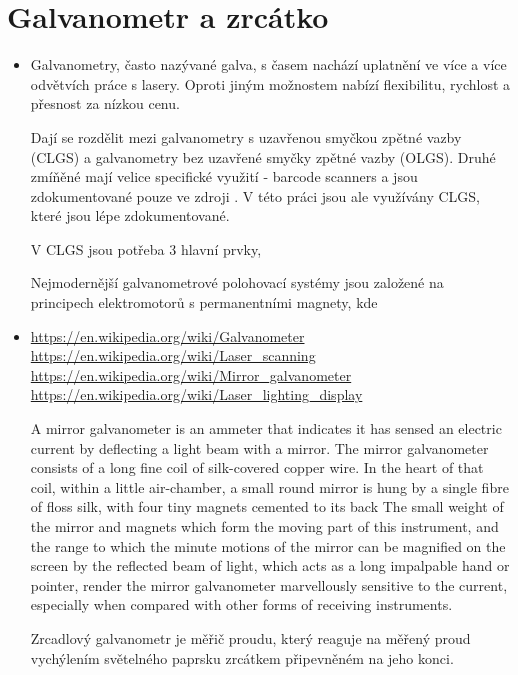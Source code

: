 \documentclass{template/socthesis}
\begin{document}
\section{Galvanometr a zrcátko}
\begin{itemize}
  \item
        Galvanometry, často nazývané galva, s časem nachází uplatnění ve více a více odvětvích práce s lasery.
        Oproti jiným možnostem nabízí flexibilitu, rychlost a přesnost za nízkou cenu.

        Dají se rozdělit mezi galvanometry s uzavřenou smyčkou zpětné vazby (CLGS) a galvanometry bez uzavřené smyčky zpětné vazby (OLGS). %
        Druhé zmíňěné mají velice specifické využití - barcode scanners a jsou zdokumentované pouze ve zdroji \cite{how-ls-work}.
        V této práci jsou ale využívány CLGS, které jsou lépe zdokumentované.

        V CLGS jsou potřeba 3 hlavní prvky, %

        Nejmodernější galvanometrové polohovací systémy jsou založené na principech elektromotorů s permanentními magnety, kde
        \cite{galva}
  \item
        \url{https://en.wikipedia.org/wiki/Galvanometer}\\
        \url{https://en.wikipedia.org/wiki/Laser_scanning}\\
        \url{https://en.wikipedia.org/wiki/Mirror_galvanometer}\\
        \url{https://en.wikipedia.org/wiki/Laser_lighting_display}

        A mirror galvanometer is an ammeter that indicates it has sensed an electric current by deflecting a light beam with a mirror.
        The mirror galvanometer consists of a long fine coil of silk-covered copper wire. %
        In the heart of that coil, within a little air-chamber, a small round mirror is hung by a single fibre of floss silk, with four tiny magnets cemented to its back
        The small weight of the mirror and magnets which form the moving part of this instrument, and the range to which the minute motions of the mirror can be magnified on the screen by the reflected beam of light, which acts as a long impalpable hand or pointer, render the mirror galvanometer marvellously sensitive to the current, especially when compared with other forms of receiving instruments.

        Zrcadlový galvanometr je měřič proudu, který reaguje na měřený proud vychýlením světelného paprsku zrcátkem připevněném na jeho konci.


\end{itemize}
\end{document}
